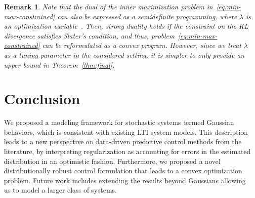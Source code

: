 \documentclass[letterpaper, 10 pt, conference]{ieeeconf}
\newtheorem{rmk}{Remark}
\begin{document}
\begin{rmk}
    Note that the dual of the inner maximization problem in~\eqref{eq:min-max-constrained} can also be expressed as a semidefinite programming, where $\lambda$ is an optimization variable~\cite[App. B.1]{boyd2004convex}.
    Then, strong duality holds if the constraint on the \gls{KL} divergence satisfies Slater’s condition, and thus, problem~\eqref{eq:min-max-constrained} can be reformulated as a convex program.
    However, since we treat $\lambda$ as a tuning parameter in the considered setting, it is simpler to only provide an upper bound in Theorem~\ref{thm:final}.
    \hfill \QED
\end{rmk}





\section{Conclusion}
We proposed a modeling framework for stochastic systems termed Gaussian behaviors, which is consistent with existing \gls{LTI} system models.
This description leads to a new perspective on data-driven predictive control methods from the literature, by interpreting regularization as accounting for errors in the estimated distribution in an optimistic fashion.
Furthermore, we proposed a novel distributionally robust control formulation that leads to a convex optimization problem.
Future work includes extending the results beyond Gaussians allowing us to model a larger class of systems.



        

\end{document}
